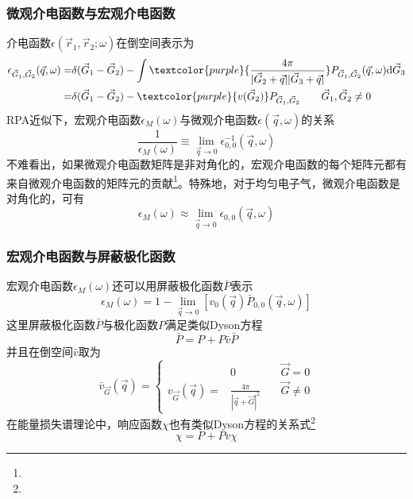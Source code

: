 {\frame
{
	\frametitle{微观介电函数与宏观介电函数}
	介电函数$\epsilon(\vec r_1,\vec r_2;\omega)$在倒空间表示为
	\begin{displaymath}
		\begin{aligned}
			\epsilon_{\vec G_1,\vec G_2}(\vec q,\omega)=&\delta(\vec G_1-\vec G_2)-\int\textcolor{purple}{\frac{4\pi}{|\vec G_2+\vec q||\vec G_3+\vec q|}}P_{\vec G_1,\vec G_2}(\vec q,\omega)\mathrm{d}\vec G_3\\
			=&\delta(\vec G_1-\vec G_2)-\textcolor{purple}{v(\vec G_2)}P_{\vec G_1,\vec G_2}\qquad \vec G_1,\vec G_2\neq0
		\end{aligned}
	\end{displaymath}
	\textrm{RPA}近似下，宏观介电函数$\epsilon_M(\omega)$与微观介电函数$\epsilon(\vec q,\omega)$的关系
	\begin{displaymath}
		\frac1{\epsilon_M(\omega)}\equiv\mathop{\mathrm{lim}}\limits_{\vec q\rightarrow0}\epsilon_{0,0}^{-1}(\vec q,\omega)
	\end{displaymath}
	不难看出，如果微观介电函数矩阵是非对角化的，宏观介电函数的每个矩阵元都有来自微观介电函数的矩阵元的贡献\footnote{\fontsize{7.0pt}{6.2pt}}。特殊地，对于均匀电子气，微观介电函数是对角化的，可有
	\begin{displaymath}
		\epsilon_M(\omega)\approx\mathop{\mathrm{lim}}\limits_{\vec q\rightarrow0}\epsilon_{0,0}(\vec q,\omega)
	\end{displaymath}
}

\frame
{
	\frametitle{宏观介电函数与屏蔽极化函数}
	宏观介电函数$\epsilon_M(\omega)$还可以用屏蔽极化函数$\bar{P}$表示
	\begin{displaymath}
		\epsilon_M(\omega)=1-\mathop{\mathrm{lim}}\limits_{\vec q\rightarrow0}[v_0(\vec q)\bar{P}_{0,0}(\vec q,\omega)]
	\end{displaymath}
	这里屏蔽极化函数$\bar{P}$与极化函数$P$满足类似\textrm{Dyson}方程
	\begin{displaymath}
		\bar{P}=P+P\bar{v}\bar{P}
	\end{displaymath}
	并且在倒空间$\bar{v}$取为
	\begin{displaymath}
		\bar{v}_{\vec G}(\vec q)=\left\{
			\begin{aligned}
				&0 &\vec G=0\\
				v_{\vec G}(\vec q)=&\frac{4\pi}{|\vec q+\vec G|^2} \quad&\vec G\neq0
			\end{aligned}\right.
	\end{displaymath}
	在能量损失谱理论中，响应函数$\chi$也有类似\textrm{Dyson}方程的关系式\footnote{\fontsize{6.1pt}{4.2pt}\selectfont{习惯上，吸收/发射光谱中响应函数称极化函数,符号用$P(\omega)$;~电子能量损失谱中响应函数称固有极化函数,符号用$\chi(\omega)$.两者都可以用宏观介电函数表示,没有本质区别.}}
\begin{displaymath}
	\chi=P+Pv\chi
\end{displaymath}
}

}
